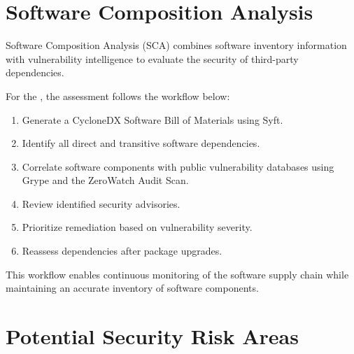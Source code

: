 \vspace{0.4cm}


\section{Software Composition Analysis}

Software Composition Analysis (SCA) combines software inventory information with vulnerability intelligence to evaluate the security of third-party dependencies.

For the \ProjectName, the assessment follows the workflow below:
\begin{enumerate}
\item Generate a CycloneDX Software Bill of Materials using Syft.
\item Identify all direct and transitive software dependencies.
\item Correlate software components with public vulnerability databases using Grype and the ZeroWatch Audit Scan.
\item Review identified security advisories.
\item Prioritize remediation based on vulnerability severity.
\item Reassess dependencies after package upgrades.
\end{enumerate}

This workflow enables continuous monitoring of the software supply chain while maintaining an accurate inventory of software components.

\vspace{0.4cm}


\section{Potential Security Risk Areas}

